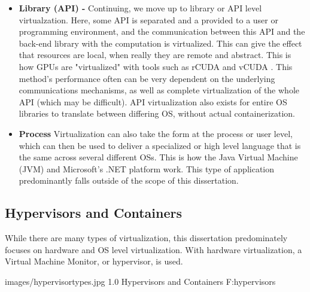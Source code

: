 \begin{itemize}
\item \textbf{Library (API) - }
Continuing, we move up to library or API level virtualzation. Here, some API is separated and a provided to a user or programming environment, and the communication between this API and the back-end library with the computation is virtualized. This can give the effect that resources are local, when really they are remote and abstract. This is how GPUs are "virtualized" with tools such as rCUDA \cite{duato2010rcuda, duato2011enabling} and vCUDA \cite{shi2012vcuda}. This method's performance often can be very dependent on the underlying communications mechanisms, as well as complete virtualization of the whole API (which may be difficult).  API virtualization also exists for entire OS libraries to translate between differing OS, without actual containerization.   

\item \textbf{Process}
Virtualization can also take the form at the process or user level, which can then be used to deliver a specialized or high level language that is the same across several different OSs. This is how the Java Virtual Machine (JVM) and Microsoft's .NET platform work. This type of application predominantly falls outside of the scope of this dissertation. 


\end{itemize}



\subsection{Hypervisors and Containers}
\label{s:hypervisors}

While there are many types of virtualization, this dissertation predominately focuses on hardware and OS level virtualization. With hardware virtualization, a Virtual Machine Monitor, or hypervisor, is used. 


  {images/hypervisortypes.jpg}
  {1.0}
  {Hypervisors and Containers}
  {F:hypervisors}

